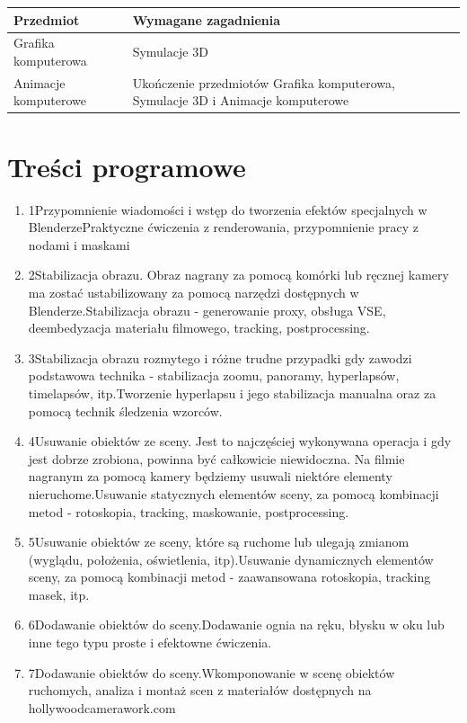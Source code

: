 \documentclass[12pt, a4paper]{article}
\begin{document}
\begin{tabularx}{\textwidth}{lX}
  \hline
  \textbf{Przedmiot} & \textbf{Wymagane zagadnienia} \\
  \hline
  Grafika komputerowa & Symulacje 3D \\
  Animacje komputerowe & Ukończenie przedmiotów  Grafika komputerowa,  Symulacje 3D i  Animacje komputerowe \\
  \hline
\end{tabularx}

\section{Treści programowe}

\begin{enumerate}
  \item 1Przypomnienie wiadomości i wstęp do tworzenia efektów specjalnych w BlenderzePraktyczne ćwiczenia z renderowania, przypomnienie pracy z nodami i maskami
  \item 2Stabilizacja obrazu. Obraz nagrany za pomocą komórki lub ręcznej kamery ma zostać ustabilizowany za pomocą narzędzi dostępnych w Blenderze.Stabilizacja obrazu - generowanie proxy, obsługa VSE, deembedyzacja materiału filmowego, tracking, postprocessing.
  \item 3Stabilizacja obrazu rozmytego i różne trudne przypadki gdy zawodzi podstawowa technika - stabilizacja zoomu, panoramy, hyperlapsów, timelapsów, itp.Tworzenie hyperlapsu i jego stabilizacja manualna oraz za pomocą technik śledzenia wzorców.
  \item 4Usuwanie obiektów ze sceny. Jest to najczęściej wykonywana operacja i gdy jest dobrze zrobiona, powinna być całkowicie niewidoczna. Na filmie nagranym za pomocą kamery będziemy usuwali niektóre elementy nieruchome.Usuwanie statycznych elementów sceny, za pomocą kombinacji metod - rotoskopia, tracking, maskowanie, postprocessing.
  \item 5Usuwanie obiektów ze sceny, które są ruchome lub ulegają zmianom (wyglądu, położenia, oświetlenia, itp).Usuwanie dynamicznych elementów sceny, za pomocą kombinacji metod - zaawansowana rotoskopia, tracking masek, itp.
  \item 6Dodawanie obiektów do sceny.Dodawanie ognia na ręku, błysku w oku lub inne tego typu proste i efektowne ćwiczenia.
  \item 7Dodawanie obiektów do sceny.Wkomponowanie w scenę obiektów ruchomych, analiza i montaż scen z materiałów dostępnych na hollywoodcamerawork.com

\end{enumerate}
\end{document}
